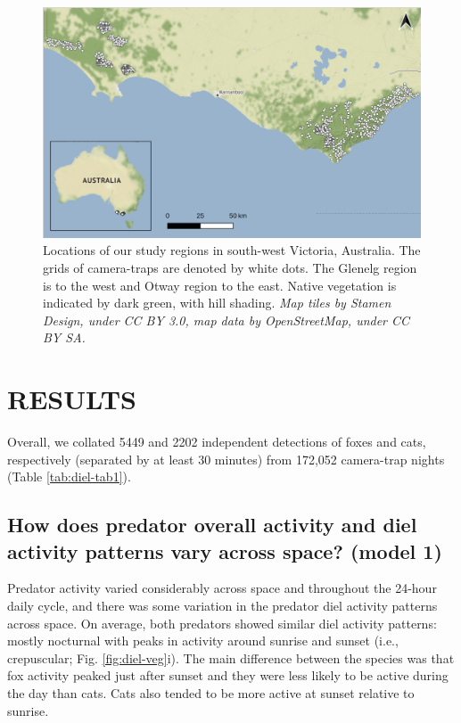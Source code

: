 \documentclass[]{elsarticle} %
\begin{document}
\begin{figure}

{\centering \includegraphics[width=1\linewidth]{../figs/map_cams} 

}

\caption{Locations of our study regions in south-west Victoria, Australia. The grids of camera-traps are denoted by white dots. The Glenelg region is to the west and Otway region to the east. Native vegetation is indicated by dark green, with hill shading. \textit{Map tiles by Stamen Design, under CC BY 3.0, map data by OpenStreetMap, under CC BY SA.}}\label{fig:diel-map}
\end{figure}

\newpage

\hypertarget{results}{%
\section{RESULTS}\label{results}}

Overall, we collated 5449 and 2202 independent detections of foxes and cats, respectively (separated by at least 30 minutes) from 172,052 camera-trap nights (Table \ref{tab:diel-tab1}).

\hypertarget{how-does-predator-overall-activity-and-diel-activity-patterns-vary-across-space-model-1-1}{%
\subsection{How does predator overall activity and diel activity patterns vary across space? (model 1)}\label{how-does-predator-overall-activity-and-diel-activity-patterns-vary-across-space-model-1-1}}

Predator activity varied considerably across space and throughout the 24-hour daily cycle, and there was some variation in the predator diel activity patterns across space. On average, both predators showed similar diel activity patterns: mostly nocturnal with peaks in activity around sunrise and sunset (i.e., crepuscular; Fig. \ref{fig:diel-veg}i). The main difference between the species was that fox activity peaked just after sunset and they were less likely to be active during the day than cats. Cats also tended to be more active at sunset relative to sunrise.
\end{document}
